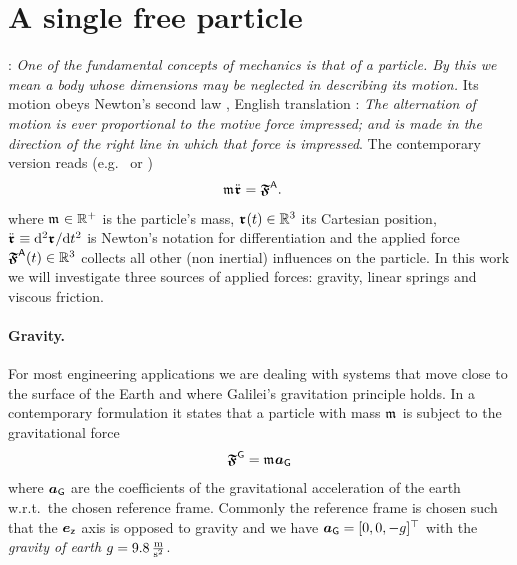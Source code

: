 \section{A single free particle}
\cite[§1]{Landau:Mechanics}: \textit{One of the fundamental concepts of mechanics is that of a \textit{particle}. By this we mean a body whose dimensions may be neglected in describing its motion.}
Its motion obeys Newton's second law \cite[p.\ 13, lex II]{Newton:Principia}, English translation \cite[p.\ 83]{Newton:PrincipiaEnglish}: \textit{The alternation of motion is ever proportional to the motive force impressed; and is made in the direction of the right line in which that force is impressed}. 
The contemporary version reads (e.g.\ \cite[eq.\ 1.3]{Goldstein:ClassicalMechanics} or \cite[eq.\ 6.1.1]{Lurie:AnalyticalMechanics})
\begin{align}\label{eq:NewtonsSecondLaw}
 \mathfrak{m}_{} \ddot{\boldsymbol{\mathfrak{r}}}_{} &= \boldsymbol{\mathfrak{F}}_{}^{\mathsf{A}}.
\end{align}
where $\mathfrak{m}_{}\in \mathbb{R}^+$ is the particle's mass, $\boldsymbol{\mathfrak{r}}_{}(t)\in\mathbb{R}^3$ its Cartesian position, $\ddot{\boldsymbol{\mathfrak{r}}}_{} \equiv \mathrm{d}^2 \boldsymbol{\mathfrak{r}}_{} / \mathrm{d} t^2$ is Newton's notation for differentiation and the applied force $\boldsymbol{\mathfrak{F}}_{}^{\mathsf{A}}(t)\in\mathbb{R}^3$ collects all other (non inertial) influences on the particle.
In this work we will investigate three sources of applied forces: gravity, linear springs and viscous friction.

\paragraph{Gravity.}
For most engineering applications we are dealing with systems that move close to the surface of the Earth and where Galilei's gravitation principle \cite[Day 3]{Galileo:TwoNewSciences} holds.
In a contemporary formulation it states that a particle with mass $\mathfrak{m}_{}$ is subject to the gravitational force
\begin{align}\label{eq:ParticleGravity}
 \boldsymbol{\mathfrak{F}}_{}^{\mathsf{G}} = \mathfrak{m}_{} \boldsymbol{a}_{\mathsf{G}}
\end{align}
where $\boldsymbol{a}_{\mathsf{G}}$ are the coefficients of the gravitational acceleration of the earth w.r.t.\ the chosen reference frame.
Commonly the reference frame is chosen such that the $\boldsymbol{e}_{\mathsf{z}}$ axis is opposed to gravity and we have $\boldsymbol{a}_{\mathsf{G}} = [0,0,-g]^\top$ with the \textit{gravity of earth} $g = 9.8\,\tfrac{\text{m}}{\text{s}^2}$.


